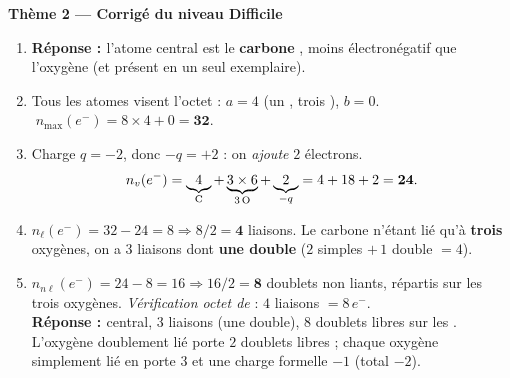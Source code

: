\documentclass[11pt,a4paper]{article}
\newcommand{\nmax}{n_{\max}(e^-)}
\newcommand{\nv}{n_{v}(e^-)}
\newcommand{\nl}{n_{\ell}(e^-)}
\newcommand{\nnl}{n_{n\ell}(e^-)}
\newcommand{\rep}{\textbf{\textcolor{corcol}{Réponse : }}}
\begin{document}
\begin{center}
{\Large\bfseries\color{primarydark}Thème 2 — Corrigé du niveau Difficile}
\end{center}
\medskip

\begin{cor}
\begin{enumerate}[label=\alph*),leftmargin=2em,itemsep=3pt]
  \item \rep l'atome central est le \textbf{carbone} , moins électronégatif que l'oxygène
        (et présent en un seul exemplaire).
  \item Tous les atomes visent l'octet : $a=4$ (un , trois ), $b=0$.
        $\;\nmax = 8\times 4 + 0 = \mathbf{32}$.
  \item Charge $q=-2$, donc $-q = +2$ : on \emph{ajoute} $2$ électrons.
        \[ \nv = \underbrace{4}_{\ce{C}} + \underbrace{3\times 6}_{3\,\ce{O}} + \underbrace{2}_{-q}
           = 4 + 18 + 2 = \mathbf{24}. \]
  \item $\nl = 32 - 24 = 8 \Rightarrow 8/2 = \mathbf{4}$ liaisons. Le carbone n'étant lié qu'à
        \textbf{trois} oxygènes, on a $3$ liaisons  dont \textbf{une double} ($2$ simples
        $+\,1$ double $= 4$).
  \item $\nnl = 24 - 8 = 16 \Rightarrow 16/2 = \mathbf{8}$ doublets non liants, répartis sur les
        trois oxygènes. \emph{Vérification octet de } : $4$ liaisons $= 8\,e^-$. \checkmark
        \\ \rep {} central, $3$ liaisons  (une double), $8$ doublets libres sur les
        . L'oxygène doublement lié porte $2$ doublets libres ; chaque oxygène simplement lié
        en porte $3$ et une charge formelle $-1$ (total $-2$).
\end{enumerate}
\end{cor}
\end{document}

